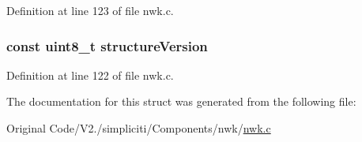 \-Definition at line 123 of file nwk.\-c.

\hypertarget{structpersistentContext__t_abaeac73e5d38f919c1377241bb5ad908}{
\subsubsection[{structure\-Version}]{\setlength{\rightskip}{0pt plus 5cm}const {\bf uint8\-\_\-t} {\bf structure\-Version}}}\label{structpersistentContext__t_abaeac73e5d38f919c1377241bb5ad908}


\-Definition at line 122 of file nwk.\-c.



\-The documentation for this struct was generated from the following file\-:\begin{DoxyCompactItemize}
\item 
\-Original Code/\-V2./simpliciti/\-Components/nwk/\hyperlink{nwk_8c}{nwk.\-c}\end{DoxyCompactItemize}
